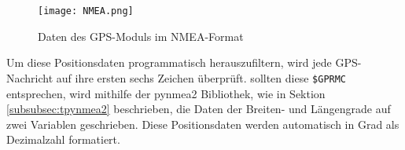 \begin{figure}[h]
\centering
\texttt{[image: NMEA.png]}
\caption{Daten des GPS-Moduls im NMEA-Format}
\label{fig:NMEA}
\end{figure}

Um diese Positionsdaten programmatisch herauszufiltern, wird jede GPS-Nachricht auf ihre ersten sechs Zeichen überprüft. sollten diese \verb|$GPRMC| entsprechen, wird mithilfe der pynmea2 Bibliothek, wie in Sektion \ref{subsubsec:tpynmea2} beschrieben, die Daten der Breiten- und Längengrade auf zwei Variablen geschrieben. Diese Positionsdaten werden automatisch in Grad als Dezimalzahl formatiert. 